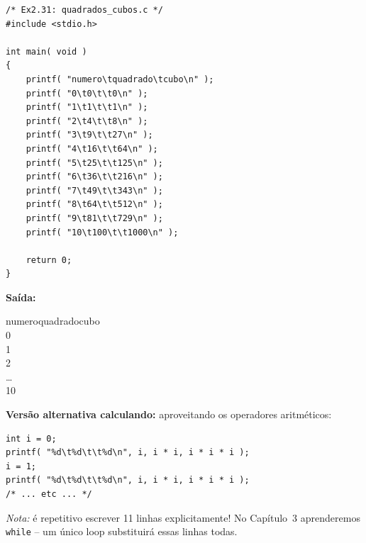 \documentclass[12pt,a4paper]{article}
\begin{document}
\begin{respostabox}
\begin{lstlisting}
/* Ex2.31: quadrados_cubos.c */
#include <stdio.h>

int main( void )
{
    printf( "numero\tquadrado\tcubo\n" );
    printf( "0\t0\t\t0\n" );
    printf( "1\t1\t\t1\n" );
    printf( "2\t4\t\t8\n" );
    printf( "3\t9\t\t27\n" );
    printf( "4\t16\t\t64\n" );
    printf( "5\t25\t\t125\n" );
    printf( "6\t36\t\t216\n" );
    printf( "7\t49\t\t343\n" );
    printf( "8\t64\t\t512\n" );
    printf( "9\t81\t\t729\n" );
    printf( "10\t100\t\t1000\n" );

    return 0;
}
\end{lstlisting}

\textbf{Saída:}
\begin{saida}
numero\quad quadrado\quad cubo\\
0\quad{}\quad\quad{}\\
1\quad{}\quad\quad{}\\
2\quad{}\quad\quad{}\\
\ldots\\
10\quad{}\quad{}
\end{saida}

\textbf{Versão alternativa calculando:} aproveitando os operadores aritméticos:
\begin{lstlisting}
int i = 0;
printf( "%d\t%d\t\t%d\n", i, i * i, i * i * i );
i = 1;
printf( "%d\t%d\t\t%d\n", i, i * i, i * i * i );
/* ... etc ... */
\end{lstlisting}

\textit{Nota:} é repetitivo escrever 11 linhas explicitamente! No Capítulo~3
aprenderemos \texttt{while} -- um único loop substituirá essas linhas todas.
\end{respostabox}
\end{document}
